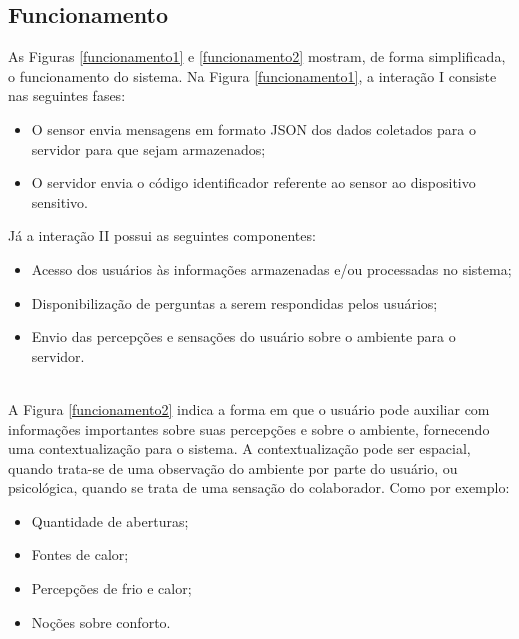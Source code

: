 \subsection{Funcionamento}
\null \quad As Figuras \ref{funcionamento1} e \ref{funcionamento2} mostram, de forma simplificada, o funcionamento do sistema. Na Figura \ref{funcionamento1}, a interação I consiste nas seguintes fases:

\begin{itemize}
  \item O sensor envia mensagens em formato JSON dos dados coletados para o servidor para que sejam armazenados;
  \item O servidor envia o código identificador referente ao sensor ao dispositivo sensitivo.
\end{itemize}

\null Já a interação II possui as seguintes componentes:
\begin{itemize}
  \item Acesso dos usuários às informações armazenadas e/ou processadas no sistema;
  \item Disponibilização de perguntas a serem respondidas pelos usuários;
  \item Envio das percepções e sensações do usuário sobre o ambiente para o servidor.
\end{itemize}
\pagebreak
{}

\\\null \quad A Figura \ref{funcionamento2} indica a forma em que o usuário pode auxiliar com informações importantes sobre suas percepções e sobre o ambiente, fornecendo uma contextualização para o sistema. A contextualização pode ser espacial, quando trata-se de uma observação do ambiente por parte do usuário, ou psicológica, quando se trata de uma sensação do colaborador. Como por exemplo:
\begin{itemize}
  \item Quantidade de aberturas;
  \item Fontes de calor;
  \item Percepções de frio e calor;
  \item Noções sobre conforto.
\end{itemize}
\pagebreak
{}

